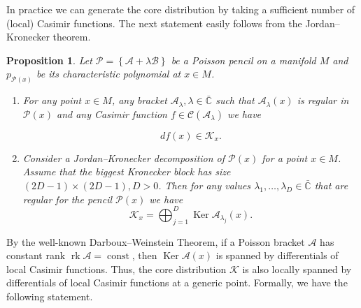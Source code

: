 \documentclass[12pt]{article}
\newtheorem{proposition}[lemma]{Proposition}
\theoremstyle{definition}
\begin{document}
In practice we can generate the core distribution by taking a sufficient number of (local) Casimir functions. The next statement easily follows from the Jordan--Kronecker theorem.

\begin{proposition} \label{Prop:CasimirAndCore} Let $\mathcal{P} = \left\{\mathcal{A} + \lambda \mathcal{B} \right\}$ be a Poisson pencil on a manifold $M$ and $p_{\mathcal{P}(x)}$ be its characteristic polynomial at $ x\in M$.


\begin{enumerate}

\item For any point $x \in M$, any bracket $\mathcal{A}_{\lambda}, \lambda \in \bar{\mathbb{C}}$ such that $\mathcal{A}_{\lambda}(x)$ is regular in $\mathcal{P}(x)$ and any Casimir function $f \in \mathcal{C} \left(\mathcal{A}_{\lambda} \right)$ we have

\[df (x) \in \mathcal{K}_x. \]

\item Consider a Jordan--Kronecker decomposition of $\mathcal{P}(x)$ for a point $x \in M$. Assume that the biggest Kronecker block has size $(2D - 1) \times (2D -1), D > 0$. Then for any values $\lambda_1, \dots, \lambda_{D} \in \bar{\mathbb{C}}$ that are regular for the pencil $\mathcal{P}(x)$ we have \[ \mathcal{K}_x = \bigoplus_{j=1}^{D} \operatorname{Ker} \mathcal{A}_{\lambda_j}(x).\] 

\end{enumerate}

\end{proposition}

By the well-known Darboux--Weinstein Theorem, if a Poisson bracket $\mathcal{A}$ has constant rank $\operatorname{rk} \mathcal{A} = \operatorname{const}$, then  $\operatorname{Ker}\mathcal{A}(x)$ is spanned by differentials of local Casimir functions. Thus, the core distribution $\mathcal{K}$ is also locally spanned by differentials of local Casimir functions at a generic point. Formally, we have the following statement.
\end{document}
